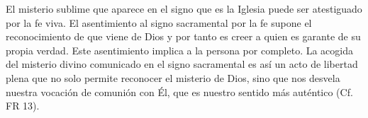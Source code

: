 El misterio sublime que aparece en el signo que es la Iglesia puede ser atestiguado por la fe viva. El asentimiento al signo sacramental por la fe supone el reconocimiento de que viene de Dios y por tanto es creer a quien es garante de su propia verdad. Este asentimiento implica a la persona por completo.
La acogida del misterio divino comunicado en el signo sacramental es así un acto de libertad plena que no solo permite reconocer el misterio de Dios, sino que nos desvela nuestra vocación de comunión con Él, que es nuestro sentido más auténtico (Cf. FR 13).


